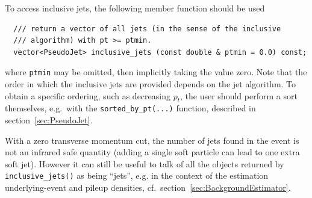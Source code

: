 \documentclass[12pt,a4]{article}
\newcommand{\ttt}[1]{{\small\texttt{#1}}}
\begin{document}
To access inclusive jets, the following member function should be used
\begin{lstlisting}
  /// return a vector of all jets (in the sense of the inclusive
  /// algorithm) with pt >= ptmin. 
  vector<PseudoJet> inclusive_jets (const double & ptmin = 0.0) const;
\end{lstlisting}
where \ttt{ptmin} may be omitted, then implicitly taking the value
zero.
%
Note that the order in which the inclusive jets are provided depends
on the jet algorithm. To obtain a specific ordering, such as
decreasing $p_t$, the user should perform a sort themselves, e.g.\
with the \ttt{sorted\_by\_pt(...)} function, described in
section~\ref{sec:PseudoJet}. 

With a zero transverse momentum cut, the number of jets found in the
event is not an infrared safe quantity (adding a single soft particle
can lead to one extra soft jet).
%
However it can still be useful to talk of all the objects returned by
\ttt{inclusive\_jets()} as being ``jets'', e.g. in the context of the
estimation underlying-event and pileup densities, cf.\
section~\ref{sec:BackgroundEstimator}. 

\end{document}
